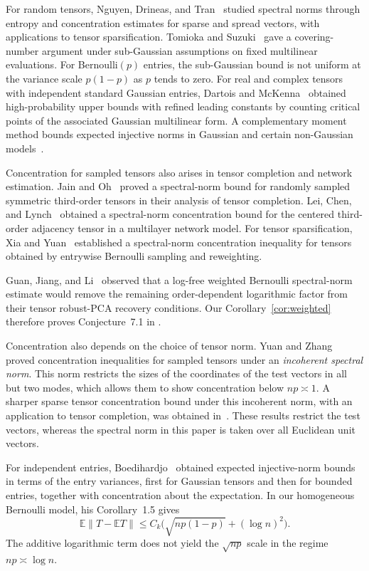 \documentclass[10pt,a4paper]{amsart}
\numberwithin{equation}{section}
\newcommand{\E}{\mathbb E}
\begin{document}
For random tensors, Nguyen, Drineas, and Tran~\cite{NDT15} studied spectral
norms through entropy and concentration estimates for sparse and spread
vectors, with applications to tensor sparsification.
Tomioka and Suzuki~\cite{TS14} gave a covering-number argument under
sub-Gaussian assumptions on fixed multilinear evaluations.
For Bernoulli$(p)$ entries, the sub-Gaussian bound is not uniform at
the variance scale $p(1-p)$ as $p$ tends to zero.
For real and complex tensors with independent standard Gaussian
entries, Dartois and McKenna~\cite{DM24} obtained
high-probability upper bounds with refined leading constants by
counting critical points of the associated Gaussian multilinear form.
A complementary moment method bounds expected injective norms in
Gaussian and certain non-Gaussian models~\cite{DM26}.

Concentration for sampled tensors also arises in tensor completion
and network estimation. Jain and Oh~\cite{JO14}
proved a spectral-norm bound for randomly sampled symmetric
third-order tensors in their analysis of tensor completion.
Lei, Chen, and Lynch~\cite{LCL20} obtained a spectral-norm
concentration bound for the centered third-order adjacency tensor
in a multilayer network model.
For tensor sparsification, Xia and Yuan~\cite{XY21}
established a spectral-norm concentration inequality for tensors
obtained by entrywise Bernoulli sampling and reweighting.


Guan, Jiang, and Li~\cite{GJL25} observed that a log-free weighted Bernoulli
spectral-norm estimate would remove the remaining order-dependent
logarithmic factor from their tensor robust-PCA recovery conditions.
Our Corollary~\ref{cor:weighted}  therefore
proves Conjecture~7.1 in \cite{GJL25}.

Concentration also depends on the choice of tensor norm.
Yuan and Zhang~\cite{YZ17} proved concentration
inequalities for sampled tensors under an \emph{incoherent spectral
norm}. This norm restricts the sizes of the coordinates of the test
vectors in all but two modes, which allows them to show concentration below $np\asymp 1$.
A sharper sparse tensor concentration bound under this incoherent
norm, with an application to tensor completion, was obtained in~\cite{LMSZ26}.
These results restrict the test vectors, whereas the spectral norm
in this paper is taken over all Euclidean unit vectors.

For independent entries, Boedihardjo~\cite{Boe24} obtained
expected injective-norm bounds in terms of the entry variances,
first for Gaussian tensors and then for bounded entries, together
with concentration about the expectation.
In our homogeneous Bernoulli model, his Corollary~1.5 gives
\[
 \E\|T-\E T\|
 \le C_k\bigl(\sqrt{np(1-p)}+(\log n)^2\bigr).
\]
The additive logarithmic term does not yield the $\sqrt{np}$ scale
in the regime $np\asymp \log n$.
\end{document}
